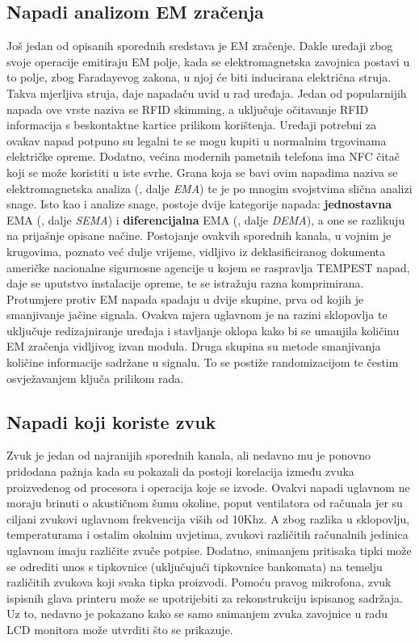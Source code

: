 \documentclass[times, utf8, diplomski]{fer}
\begin{document}
\subsection{Napadi analizom EM zračenja}
Još jedan od opisanih sporednih sredstava je EM zračenje. Dakle uređaji zbog svoje operacije emitiraju EM polje, kada se elektromagnetska zavojnica postavi u to polje, zbog Faradayevog zakona, u njoj će biti inducirana električna struja. Takva mjerljiva struja, daje napadaču uvid u rad uređaja. Jedan od popularnijih napada ove vrste naziva se RFID skimming, a uključuje očitavanje RFID informacija s beskontaktne kartice prilikom korištenja. Uređaji potrebni za ovakav napad potpuno su legalni te se mogu kupiti u normalnim trgovinama električke opreme. Dodatno, većina modernih pametnih telefona ima NFC čitač koji se može koristiti u iste svrhe. Grana koja se bavi ovim napadima naziva se elektromagnetska analiza (, dalje \emph{EMA}) te je po mnogim svojstvima slična analizi snage. Isto kao i analize snage, postoje dvije kategorije napada: \textbf{jednostavna} EMA (, dalje \emph{SEMA}) i \textbf{diferencijalna} EMA (, dalje \emph{DEMA}), a one se razlikuju na prijašnje opisane načine. Postojanje ovakvih sporednih kanala, u vojnim je krugovima, poznato već dulje vrijeme, vidljivo iz deklasificiranog dokumenta \citep{mcconnell1992national} američke nacionalne sigurnosne agencije  u kojem se raspravlja TEMPEST napad, daje se uputstvo instalacije opreme, te se istražuju razna komprimirana.
Protumjere protiv EM napada spadaju u dvije skupine, prva od kojih je smanjivanje jačine signala. Ovakva mjera uglavnom je na razini sklopovlja te uključuje redizajniranje uređaja i stavljanje oklopa kako bi se umanjila količinu EM zračenja vidljivog izvan modula. Druga skupina su metode smanjivanja količine informacije sadržane u signalu. To se postiže randomizacijom te čestim osvježavanjem ključa prilikom rada.

\subsection{Napadi koji koriste zvuk}

Zvuk je jedan od najranijih sporednih kanala, ali nedavno mu je ponovno pridodana pažnja kada su \cite{shamir2004acoustic} pokazali da postoji korelacija između zvuka proizvedenog od procesora i operacija koje se izvode. Ovakvi napadi uglavnom ne moraju brinuti o akustičnom šumu okoline, poput ventilatora od računala jer su ciljani zvukovi uglavnom frekvencija viših od 10Khz. A zbog razlika u sklopovlju, temperaturama i ostalim okolnim uvjetima, zvukovi različitih računalnih jedinica uglavnom imaju različite zvuče potpise. Dodatno, snimanjem pritisaka tipki može se odrediti unos s tipkovnice (uključujući tipkovnice bankomata) na temelju različitih zvukova koji svaka tipka proizvodi. Pomoću pravog mikrofona, zvuk ispisnih glava printeru može se upotrijebiti za rekonstrukciju ispisanog sadržaja. Uz to, nedavno je pokazano kako se samo snimanjem zvuka zavojnice u radu  LCD monitora može utvrditi što se prikazuje.
\end{document}
